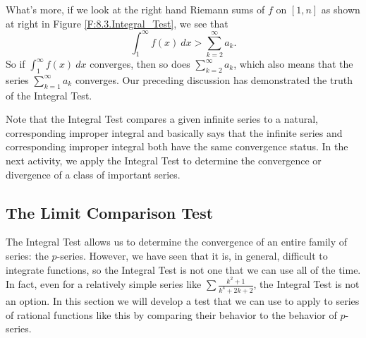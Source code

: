 What's more, if we look at the right hand Riemann sums of $f$ on $[1,n]$ as shown at right in Figure \ref{F:8.3.Integral_Test}, we see that
\[\int_{1}^{\infty} f(x) \ dx >  \sum_{k=2}^{\infty} a_k.\]
So if $ \int_{1}^{\infty} f(x) \ dx$ converges, then so does $ \sum_{k=2}^{\infty} a_k$, which also means that the series $ \sum_{k=1}^{\infty} a_k$ converges. Our preceding discussion has demonstrated the truth of the Integral Test.

\vspace*{5pt}
\nin {}
\vspace*{1pt}

Note that the Integral Test compares a given infinite series to a natural, corresponding improper integral and basically says that the infinite series and corresponding improper integral both have the same convergence status.  In the next activity, we apply the Integral Test to determine the convergence or divergence of a class of important series.

\newpage



\subsection*{The Limit Comparison Test}

The Integral Test allows us to determine the convergence of an entire family of series: the $p$-series. However, we have seen that it is, in general, difficult to integrate functions, so the Integral Test is not one that we can use all of the time. In fact, even for a relatively simple series like $ \sum \frac{k^2+1}{k^4+2k+2}$, the Integral Test is not an option. In this section we will develop a test that we can use to apply to series of rational functions like this by comparing their behavior to the behavior of $p$-series.

